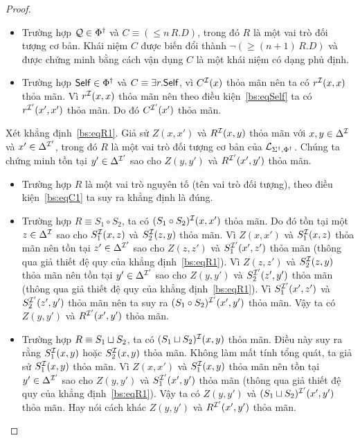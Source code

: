 \begin{proof}
\begin{itemize}
		\item Trường hợp $\mathcal{Q} \in \Phi^\dag$ và $C \equiv (\leq\!n\,R.D)$, trong đó $R$ là một vai trò đối tượng cơ bản. Khái niệm $C$ được biến đổi thành $\neg (\geq\!(n+1)\,R.D)$ và được chứng minh bằng cách vận dụng $C$ là một khái niệm có dạng phủ định.
		
		\item Trường hợp $\mathsf{Self} \in \Phi^\dag$ và $C \equiv \exists r.\mathsf{Self}$, vì $C^{\mathcal{I}}(x)$ thỏa mãn nên ta có $r^{\mathcal{I}}(x,x)$ thỏa mãn. Vì $r^{\mathcal{I}}(x,x)$ thỏa mãn nên theo điều kiện~\eqref{bs:eqSelf} ta có $r^{\mathcal{I}'}(x',x')$ thỏa mãn. Do đó $C^{\mathcal{I}'}(x')$ thỏa mãn.
	\end{itemize}
	
	\semiItem Xét khẳng định~\eqref{bs:eqR1}. Giả sử $Z(x,x')$ và $R^{\mathcal{I}}(x,y)$ thỏa mãn với $x, y \in \Delta^{\mathcal{I}}$ và $x' \in \Delta^{\mathcal{I}'}$, trong đó $R$ là một vai trò đối tượng cơ bản của $\mathcal{L}_{\Sigma^\dag,\Phi^\dag}$. Chúng ta chứng minh tồn tại $y' \in \Delta^{\mathcal{I}'}$ sao cho $Z(y,y')$ và $R^{\mathcal{I}'}(x',y')$ thỏa mãn.
	\begin{itemize}
		\item Trường hợp $R$ là một vai trò nguyên tố (tên vai trò đối tượng), theo điều kiện~\eqref{bs:eqC1} ta suy ra khẳng định là đúng.
		
		\item Trường hợp $R \equiv S_1 \circ S_2$, ta có $(S_1 \circ S_2)^{\mathcal{I}}(x,x')$ thỏa mãn. Do đó tồn tại một $z \in \Delta^{\mathcal{I}}$ sao cho $S_1^{\mathcal{I}}(x,z)$ và $S_2^{\mathcal{I}}(z,y)$ thỏa mãn. Vì $Z(x,x')$ và $S_1^{\mathcal{I}}(x,z)$ thỏa mãn nên tồn tại $z' \in \Delta^{\mathcal{I}'}$ sao cho $Z(z,z')$ và $S_1^{\mathcal{I}'}(x',z')$ thỏa mãn (thông qua giả thiết đệ quy của khẳng định~\eqref{bs:eqR1}). Vì $Z(z,z')$ và $S_2^{\mathcal{I}}(z,y)$ thỏa mãn nên tồn tại $y' \in \Delta^{\mathcal{I}'}$ sao cho $Z(y,y')$ và $S_2^{\mathcal{I}'}(z',y')$ thỏa mãn (thông qua giả thiết đệ quy của khẳng định~\eqref{bs:eqR1}). Vì $S_1^{\mathcal{I}'}(x',z')$ và $S_2^{\mathcal{I}'}(z',y')$ thỏa mãn nên ta suy ra $(S_1 \circ S_2)^{\mathcal{I}'}(x',y')$ thỏa mãn. Vậy ta có $Z(y,y')$ và $R^{\mathcal{I}'}(x',y')$ thỏa mãn.
		
		\item Trường hợp $R \equiv S_1 \sqcup S_2$, ta có $(S_1 \sqcup S_2)^{\mathcal{I}}(x,y)$ thỏa mãn. Điều này suy ra rằng $S_1^{\mathcal{I}}(x,y)$ hoặc $S_2^{\mathcal{I}}(x,y)$ thỏa mãn. Không làm mất tính tổng quát, ta giả sử $S_1^{\mathcal{I}}(x,y)$ thỏa mãn. Vì $Z(x,x')$ và $S_1^{\mathcal{I}}(x,y)$ thỏa mãn nên tồn tại $y' \in \Delta^{\mathcal{I}'}$ sao cho $Z(y,y')$ và $S_1^{\mathcal{I}'}(x',y')$ thỏa mãn (thông qua giả thiết đệ quy của khẳng định~\eqref{bs:eqR1}). Vậy ta có $Z(y,y')$ và $(S_1 \sqcup S_2)^{\mathcal{I}'}(x',y')$ thỏa mãn. Hay nói cách khác $Z(y,y')$ và $R^{\mathcal{I}'}(x',y')$ thỏa mãn.
		

\end{itemize}
\end{proof}
